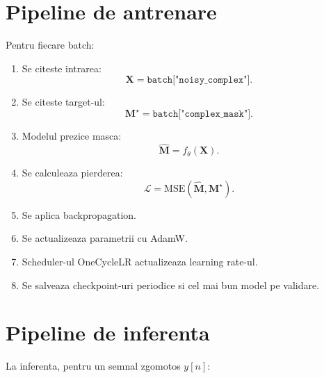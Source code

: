 \documentclass[12pt,a4paper]{article}
\begin{document}
\section{Pipeline de antrenare}

Pentru fiecare batch:

\begin{enumerate}
    \item Se citeste intrarea:
    \begin{equation}
        \bm{X} = \texttt{batch["noisy\_complex"]}.
    \end{equation}
    \item Se citeste target-ul:
    \begin{equation}
        \bm{M}^{\star} = \texttt{batch["complex\_mask"]}.
    \end{equation}
    \item Modelul prezice masca:
    \begin{equation}
        \hat{\bm{M}} = f_{\theta}(\bm{X}).
    \end{equation}
    \item Se calculeaza pierderea:
    \begin{equation}
        \mathcal{L} =
        \mathrm{MSE}(\hat{\bm{M}}, \bm{M}^{\star}).
    \end{equation}
    \item Se aplica backpropagation.
    \item Se actualizeaza parametrii cu AdamW.
    \item Scheduler-ul OneCycleLR actualizeaza learning rate-ul.
    \item Se salveaza checkpoint-uri periodice si cel mai bun model pe validare.
\end{enumerate}

\section{Pipeline de inferenta}

La inferenta, pentru un semnal zgomotos $y[n]$:
\end{document}
